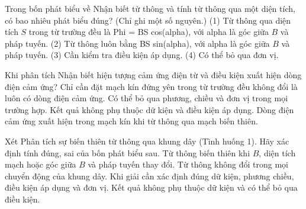 \begin{ex}
Trong bốn phát biểu về Nhận biết từ thông và tính từ thông qua một diện tích, có bao nhiêu phát biểu đúng? (Chỉ ghi một số nguyên.) (1) Từ thông qua diện tích $S$ trong từ trường đều là Phi = BS cos(alpha), với alpha là góc giữa $B$ và pháp tuyến. (2) Từ thông luôn bằng BS sin(alpha), với alpha là góc giữa $B$ và pháp tuyến. (3) Cần kiểm tra điều kiện áp dụng. (4) Có thể bỏ qua đơn vị.
\end{ex}

\begin{ex}
Khi phân tích Nhận biết hiện tượng cảm ứng điện từ và điều kiện xuất hiện dòng điện cảm ứng?
\choice
{Chỉ cần đặt mạch kín đứng yên trong từ trường đều không đổi là luôn có dòng điện cảm ứng.}
{Có thể bỏ qua phương, chiều và đơn vị trong mọi trường hợp.}
{Kết quả không phụ thuộc dữ kiện và điều kiện áp dụng.}
{\True Dòng điện cảm ứng xuất hiện trong mạch kín khi từ thông qua mạch biến thiên.}
\end{ex}

\begin{ex}
Xét Phân tích sự biến thiên từ thông qua khung dây (Tình huống 1). Hãy xác định tính đúng, sai của bốn phát biểu sau.
\choiceTF
{\True Từ thông biến thiên khi $B$, diện tích mạch hoặc góc giữa $B$ và pháp tuyến thay đổi.}
{Từ thông không đổi trong mọi chuyển động của khung dây.}
{\True Khi giải cần xác định đúng dữ kiện, phương chiều, điều kiện áp dụng và đơn vị.}
{Kết quả không phụ thuộc dữ kiện và có thể bỏ qua điều kiện.}
\end{ex}

